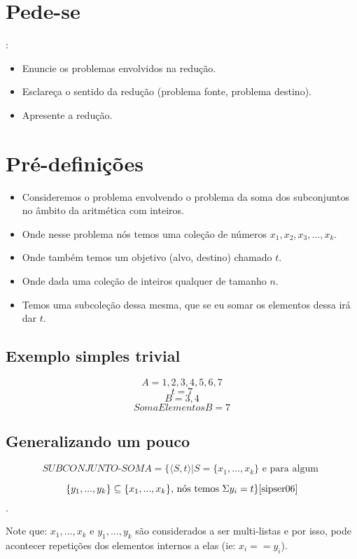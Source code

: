 \documentclass[12pt, a4paper]{article}
\begin{document}
\section{Pede-se}:

\begin{itemize}
  \item Enuncie os problemas envolvidos na redução.
  \item Esclareça o sentido da redução (problema fonte, problema destino).
  \item Apresente a redução.
\end{itemize}

\section{Pré-definições}

\begin{itemize}
  \item Consideremos o problema envolvendo o problema da soma dos subconjuntos no âmbito da aritmética com inteiros.
  \item Onde nesse problema nós temos uma coleção de números $x_1,x_2,x_3,...,x_k$.
  \item Onde também temos um objetivo (alvo, destino) chamado $t$.
  \item Onde dada uma coleção de inteiros qualquer de tamanho $n$.
  \item Temos uma subcoleção dessa mesma, que se eu somar os elementos dessa irá dar $t$.
\end{itemize}

\subsection{Exemplo simples trivial}

$$A = {1,2,3,4,5,6,7}$$
$$t = 7$$
$$B = {3, 4}$$
$$SomaElementosB = 7$$

\subsection{Generalizando um pouco}

$$ \textit{SUBCONJUNTO-SOMA} = \lbrace \langle S, t \rangle | S = \lbrace  x_1,...,x_k \rbrace \text{ e para algum }$$

$$ \lbrace y_1,...,y_k \rbrace \subseteq \lbrace  x_1,...,x_k \rbrace \text{, nós temos } \Sigma{y_i} = t \rbrace \cite{sipser06}$$.

Note que: $x_1,...,x_k$ e $y_1,...,y_k$ são considerados a ser multi-listas e por isso, pode acontecer repetições dos elementos internos a elas (ie: $x_i == y_i$).
\end{document}
